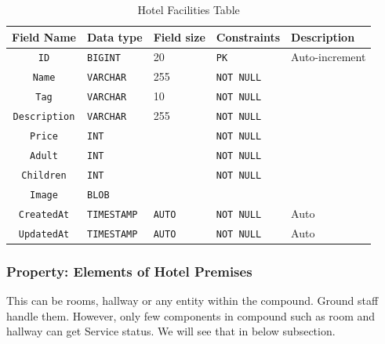 \begin{table}[H]
	\centering
	\begin{tabular}{cllll}
		\hline
		Field Name & Data type & Field size & Constraints & Description \\ \hline
		\texttt{ID} & \texttt{BIGINT} & 20 & \texttt{PK} & Auto-increment \\
		\texttt{Name} & \texttt{VARCHAR} & 255 & \texttt{NOT NULL} &  \\
		\texttt{Tag} & \texttt{VARCHAR} & 10 & \texttt{NOT NULL} &  \\
		\texttt{Description} & \texttt{VARCHAR} & 255 & \texttt{NOT NULL} &  \\
		\texttt{Price} & \texttt{INT} & & \texttt{NOT NULL} &  \\
		\texttt{Adult} & \texttt{INT} & & \texttt{NOT NULL} &  \\
		\texttt{Children} & \texttt{INT} & & \texttt{NOT NULL} &  \\
		\texttt{Image} & \texttt{BLOB} & & &  \\
		
		\texttt{CreatedAt} & \texttt{TIMESTAMP} & \texttt{AUTO} & \texttt{NOT NULL} & Auto \\
		\texttt{UpdatedAt} & \texttt{TIMESTAMP} & \texttt{AUTO} & \texttt{NOT NULL} & Auto \\
		\hline
	\end{tabular}
	\caption{Hotel Facilities Table}
\end{table}

\subsubsection{Property: Elements of Hotel Premises}

This can be rooms, hallway or any entity within the compound. Ground staff handle them. However, only few components in compound such as room and hallway can get Service status. We will see that in below subsection.

